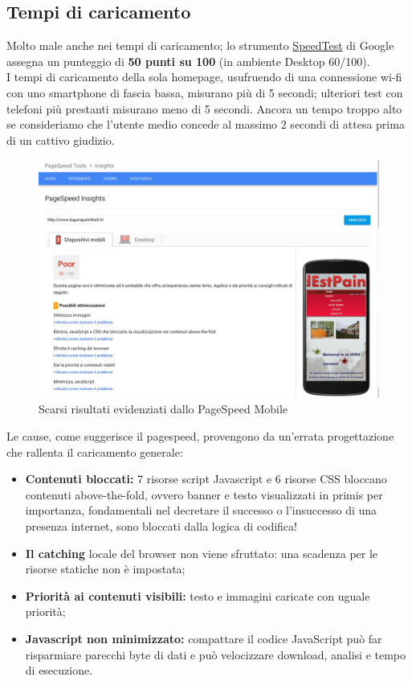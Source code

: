 \documentclass[../Relazione.tex]{subfiles}
\begin{document}
	\subsection{Tempi di caricamento}
		Molto male anche nei tempi di caricamento; lo strumento \href{https://developers.google.com/speed/pagespeed/insights/}{SpeedTest} di Google assegna un punteggio di \textbf{50 punti su 100} (in ambiente Desktop 60/100).\\
		I tempi di caricamento della sola homepage, usufruendo di una connessione wi-fi con uno smartphone di fascia bassa, misurano più di 5 secondi; ulteriori test con telefoni più prestanti misurano meno di 5 secondi. Ancora un tempo troppo alto se consideriamo che l'utente medio concede al massimo 2 secondi di attesa prima di un cattivo giudizio.
			\begin{figure}[!h]
				\centering
				\includegraphics[width=\textwidth]{img/sito/PageSpeedMobile.png}
				\caption{Scarsi risultati evidenziati dallo PageSpeed Mobile}
				\label{fig:label}
			\end{figure}
		Le cause, come suggerisce il pagespeed, provengono da un'errata progettazione che rallenta il caricamento generale:
		\begin{itemize}
			\item \textbf{Contenuti bloccati:} 7 risorse script Javascript e 6 risorse CSS bloccano contenuti above-the-fold, ovvero banner e testo visualizzati in primis per importanza, fondamentali nel decretare il successo o l’insuccesso di una presenza internet, sono bloccati dalla logica di codifica!
			\item \textbf{Il catching} locale del browser non viene sfruttato: una scadenza per le risorse statiche non è impostata;
			\item \textbf{Priorità ai contenuti visibili:} testo e immagini caricate con uguale priorità;
			\item \textbf{Javascript non minimizzato:} compattare il codice JavaScript può far risparmiare parecchi byte di dati e può velocizzare download, analisi e tempo di esecuzione.
		\end{itemize}
\end{document}
